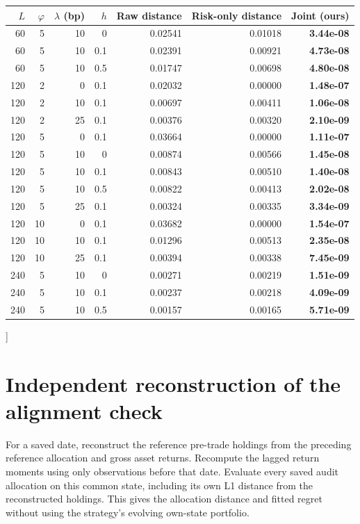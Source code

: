 \documentclass[sigconf,anonymous,review]{acmart}
\begin{document}
{\begin{center}
\label{tab:fullrobust}
\begin{tabular}{rrrrrrr}\toprule
$L$ & $\varphi$ & $\lambda$ (bp) & $h$ & Raw distance & Risk-only distance & \textbf{Joint (ours)}\\\midrule
60 & 5 & 10 & 0 & 0.02541 & 0.01018 & \textbf{3.44e-08} \\
60 & 5 & 10 & 0.1 & 0.02391 & 0.00921 & \textbf{4.73e-08} \\
60 & 5 & 10 & 0.5 & 0.01747 & 0.00698 & \textbf{4.80e-08} \\
120 & 2 & 0 & 0.1 & 0.02032 & 0.00000 & \textbf{1.48e-07} \\
120 & 2 & 10 & 0.1 & 0.00697 & 0.00411 & \textbf{1.06e-08} \\
120 & 2 & 25 & 0.1 & 0.00376 & 0.00320 & \textbf{2.10e-09} \\
120 & 5 & 0 & 0.1 & 0.03664 & 0.00000 & \textbf{1.11e-07} \\
120 & 5 & 10 & 0 & 0.00874 & 0.00566 & \textbf{1.45e-08} \\
120 & 5 & 10 & 0.1 & 0.00843 & 0.00510 & \textbf{1.40e-08} \\
120 & 5 & 10 & 0.5 & 0.00822 & 0.00413 & \textbf{2.02e-08} \\
120 & 5 & 25 & 0.1 & 0.00324 & 0.00335 & \textbf{3.34e-09} \\
120 & 10 & 0 & 0.1 & 0.03682 & 0.00000 & \textbf{1.54e-07} \\
120 & 10 & 10 & 0.1 & 0.01296 & 0.00513 & \textbf{2.35e-08} \\
120 & 10 & 25 & 0.1 & 0.00394 & 0.00338 & \textbf{7.45e-09} \\
240 & 5 & 10 & 0 & 0.00271 & 0.00219 & \textbf{1.51e-09} \\
240 & 5 & 10 & 0.1 & 0.00237 & 0.00218 & \textbf{4.09e-09} \\
240 & 5 & 10 & 0.5 & 0.00157 & 0.00165 & \textbf{5.71e-09} \\
\bottomrule\end{tabular}
\end{center}
}]

\section{Independent reconstruction of the alignment check}\label{app:verification}
For a saved date, reconstruct the reference pre-trade holdings from the preceding reference allocation and gross asset returns. Recompute the lagged return moments using only observations before that date. Evaluate every saved audit allocation on this common state, including its own L1 distance from the reconstructed holdings. This gives the allocation distance and fitted regret without using the strategy's evolving own-state portfolio.
\end{document}
